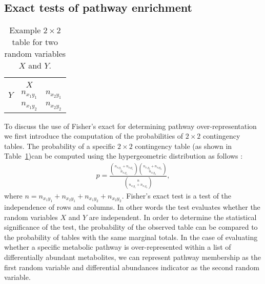 \begin{DoubleSpace*}
\section{Exact tests of pathway enrichment}
\begin{table}[H]
		\caption[Example $2 \times 2$ table for two random variables $X$ and $Y$]{\DoubleSpacing Example $2 \times 2$ table for two random variables $X$ and $Y$. \label{tab:twoByTwo} }
	\centering
	\begin{tabular}{l  | c  c}
		& & \\
		 &	$X$ & \\
		\hline
		$Y$ & $n_{x_1 y_1}$ & $n_{x_2 y_1}$ \\
		& $n_{x_1 y_2}$ & $n_{x_2 y_2}$ \\
	\end{tabular}
\end{table}
To discuss the use of Fisher's exact for determining pathway over-representation we first introduce the computation of the probabilities of $2 \times 2$ contingency tables. The probability of a specific $2\times 2$ contingency table (as shown in Table~\ref{tab:twoByTwo})can be computed using the hypergeometric distribution as follows \cite{agresti2013}:
\begin{align}
	p = \frac{{n_{x_1 y_1}+n_{x_2 y_1}\choose n_{x_1 y_1}} {n_{x_1 y_2}+n_{x_2 y_2}\choose n_{x_1 y_2}} }{{n\choose n_{x_1 y_1}+n_{x_1 y_2}}},
\end{align}
where $n=n_{x_1 y_1}+  n_{x_2 y_1} +n_{x_1 y_2}+n_{x_2 y_2}$. Fisher's exact test is a test of the independence of rows and columns. In other words the test evaluates whether the random variables $X$ and $Y$ are independent. In order to determine the statistical significance of the test, the probability of the observed table can be compared to the probability of tables with the same marginal totals. In the case of evaluating whether a specific metabolic pathway is over-represented within a list of differentially abundant metabolites, we can represent pathway membership as the first random variable and differential abundances indicator as the second random variable. 


\end{DoubleSpace*}
